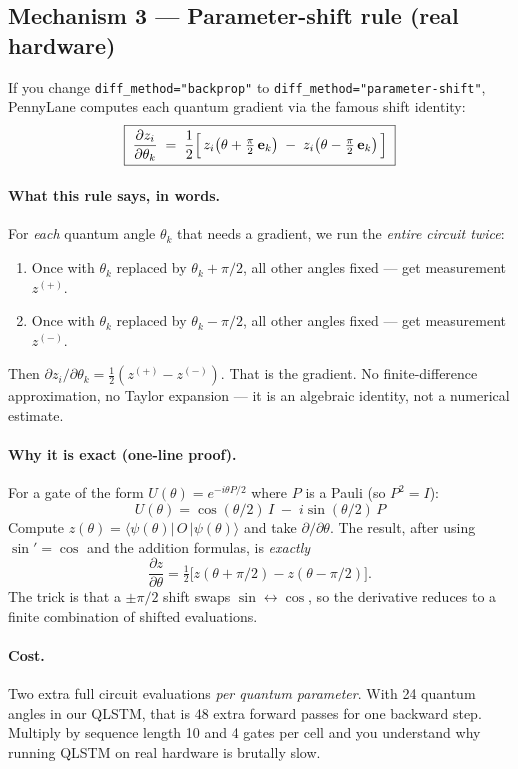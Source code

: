 \documentclass[11pt,a4paper]{article}
\begin{document}
\subsection{Mechanism 3 --- Parameter-shift rule (real hardware)}

If you change \texttt{diff\_method="backprop"} to \texttt{diff\_method="parameter-shift"}, PennyLane computes each quantum gradient via the famous shift identity:
\[
  \boxed{\;\frac{\partial z_i}{\partial \theta_k} \;=\; \frac{1}{2}\Bigl[\, z_i\bigl(\theta + \tfrac{\pi}{2}\,\mathbf{e}_k\bigr) \;-\; z_i\bigl(\theta - \tfrac{\pi}{2}\,\mathbf{e}_k\bigr)\,\Bigr]\;}
\]

\paragraph{What this rule says, in words.} For \emph{each} quantum angle $\theta_k$ that needs a gradient, we run the \emph{entire circuit twice}:
\begin{enumerate}
  \item Once with $\theta_k$ replaced by $\theta_k + \pi/2$, all other angles fixed --- get measurement $z^{(+)}$.
  \item Once with $\theta_k$ replaced by $\theta_k - \pi/2$, all other angles fixed --- get measurement $z^{(-)}$.
\end{enumerate}
Then $\partial z_i / \partial \theta_k = \tfrac{1}{2}(z^{(+)} - z^{(-)})$. That is the gradient. No finite-difference approximation, no Taylor expansion --- it is an algebraic identity, not a numerical estimate.

\paragraph{Why it is exact (one-line proof).} For a gate of the form $U(\theta) = e^{-i\theta P/2}$ where $P$ is a Pauli (so $P^2 = I$):
\[
  U(\theta) = \cos(\theta/2)\,I \;-\; i\sin(\theta/2)\,P
\]
Compute $z(\theta) = \langle\psi(\theta)|\,O\,|\psi(\theta)\rangle$ and take $\partial/\partial\theta$. The result, after using $\sin' = \cos$ and the addition formulas, is \emph{exactly}
\[
  \frac{\partial z}{\partial \theta} = \tfrac{1}{2}\bigl[z(\theta + \pi/2) - z(\theta - \pi/2)\bigr].
\]
The trick is that a $\pm\pi/2$ shift swaps $\sin \leftrightarrow \cos$, so the derivative reduces to a finite combination of shifted evaluations.

\paragraph{Cost.} Two extra full circuit evaluations \emph{per quantum parameter}. With 24 quantum angles in our QLSTM, that is 48 extra forward passes for one backward step. Multiply by sequence length 10 and 4 gates per cell and you understand why running QLSTM on real hardware is brutally slow.
\end{document}

